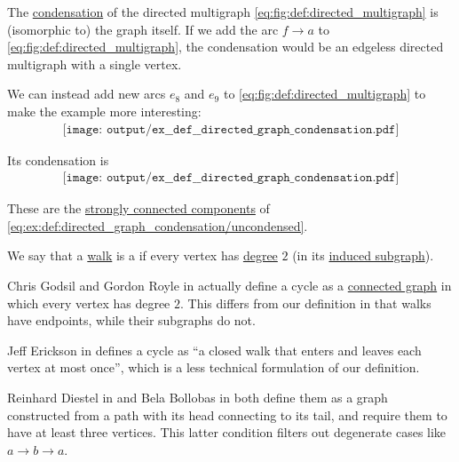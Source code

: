 \begin{example}\label{ex:def:directed_graph_condensation}
  The \hyperref[def:directed_graph_condensation]{condensation} of the directed multigraph \eqref{eq:fig:def:directed_multigraph} is (isomorphic to) the graph itself. If we add the arc \( f \to a \) to \eqref{eq:fig:def:directed_multigraph}, the condensation would be an edgeless directed multigraph with a single vertex.

  We can instead add new arcs \( e_8 \) and \( e_9 \) to \eqref{eq:fig:def:directed_multigraph} to make the example more interesting:
  \begin{equation}\label{eq:ex:def:directed_graph_condensation/uncondensed}
    \begin{aligned}
      \texttt{[image: output/ex\_\_def\_\_directed\_graph\_condensation.pdf]}
    \end{aligned}
  \end{equation}

  Its condensation is
  \begin{equation}\label{eq:ex:def:directed_graph_condensation/condensed}
    \begin{aligned}
      \texttt{[image: output/ex\_\_def\_\_directed\_graph\_condensation.pdf]}
    \end{aligned}
  \end{equation}

  These are the \hyperref[def:graph_connectedness/strong]{strongly connected components} of \eqref{eq:ex:def:directed_graph_condensation/uncondensed}.
\end{example}

\begin{definition}\label{def:graph_cycle}
  We say that a \hyperref[def:graph_walk]{walk} is a  if every vertex has \hyperref[def:graph_cardinality/directed_degree]{degree} \( 2 \) (in its \hyperref[def:graph_walk/subgraph]{induced subgraph}).
\end{definition}
\begin{comments}
  \item Chris Godsil and Gordon Royle in \cite[4]{GodsilRoyle2001} actually define a cycle as a \hyperref[def:graph_connectedness]{connected graph} in which every vertex has degree \( 2 \). This differs from our definition in that walks have endpoints, while their subgraphs do not.

  Jeff Erickson in \cite[191]{Erickson2019} defines a cycle as \enquote{a closed walk that enters and leaves each vertex at most once}, which is a less technical formulation of our definition.

  Reinhard Diestel in \cite[7]{Diestel2005} and Bela Bollobas in \cite[5]{Bollobas1998} both define them as a graph constructed from a path with its head connecting to its tail, and require them to have at least three vertices. This latter condition filters out degenerate cases like \( a \to b \to a \).
\end{comments}

